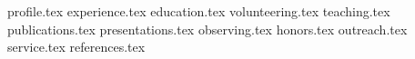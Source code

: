 \documentclass[11pt, a4paper]{awesome-cv}
\newcommand*{\sectiondir}{resume/}
\begin{document}
\makecvheader

{profile.tex}
{experience.tex}
\clearpage
{education.tex}
{volunteering.tex}
{teaching.tex}
\clearpage
{publications.tex}
{presentations.tex}
\clearpage
{observing.tex}
{honors.tex}
{outreach.tex}
\clearpage
{service.tex}
{references.tex}
\end{document}

